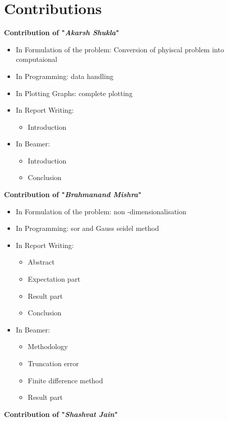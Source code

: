 \section{Contributions}
	{\large{\bf {Contribution of "{\it Akarsh Shukla}"}}}
	\begin{itemize}
		\item In Formulation of the problem: Conversion of phyiscal problem into computaional 
		\item  In Programming: data handling
		\item  In Plotting Graphs: complete plotting
		\item  In Report Writing: 
			\begin{itemize}
				\item  Introduction
			\end{itemize}
		\item  In Beamer: 
		\begin{itemize}
			\item  Introduction
			\item Conclusion
			
		\end{itemize}

		
	\end{itemize}
	{\large{\bf {Contribution of "{\it Brahmanand Mishra}"}}}
	\begin{itemize}
		\item In Formulation of the problem:  non -dimensionalisation 
		\item  In Programming: sor and Gauss seidel method 
		\item  In Report Writing:
			\begin{itemize}
				\item Abstract
				\item Expectation part
				\item Result part 
				\item Conclusion
			\end{itemize}
		\item  In Beamer:
		\begin{itemize}
			\item Methodology
			\item Truncation error
			\item Finite difference method
			\item Result part 
		\end{itemize}
		
	\end{itemize}
	{\large{\bf {Contribution of "{\it Shashvat Jain}"}}}
